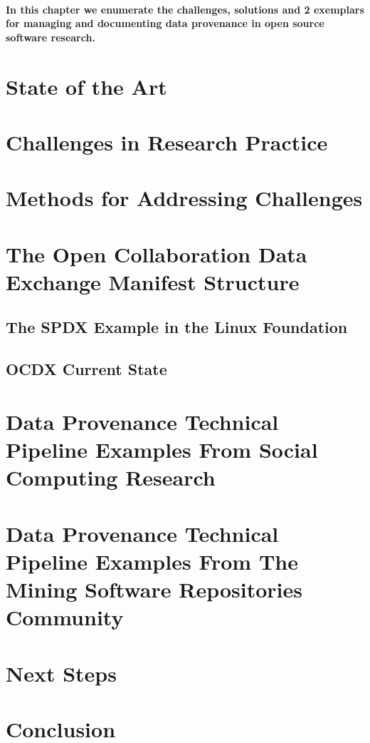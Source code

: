 \paragraph{In this chapter we enumerate the challenges, solutions and 2 exemplars for managing and documenting data provenance in open source software research.}
\section{State of the Art}

\section{Challenges in Research Practice}

\section{Methods for Addressing Challenges}

\section{The Open Collaboration Data Exchange Manifest Structure}
\subsection{The SPDX Example in the Linux Foundation}
\subsection{OCDX Current State}

\section{Data Provenance Technical Pipeline Examples From Social Computing Research}

\section{Data Provenance Technical Pipeline Examples From The Mining Software Repositories Community}


\section{Next Steps}

\section{Conclusion}